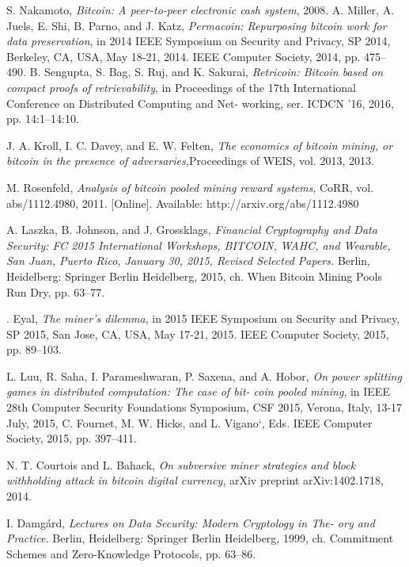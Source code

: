 \documentclass[12pt]{article}
\begin{document}
\begin{thebibliography}{9}
 
 S. Nakamoto,
 \textit{Bitcoin: A peer-to-peer electronic cash system}, 2008.
 A. Miller, A. Juels, E. Shi, B. Parno, and J. Katz,
 \textit{Permacoin: Repurposing bitcoin work for data preservation}, in 2014 IEEE Symposium on Security and Privacy, SP 2014, Berkeley, CA, USA, May 18-21, 2014. IEEE Computer Society, 2014, pp. 475–490.
 B. Sengupta, S. Bag, S. Ruj, and K. Sakurai,
 \textit{Retricoin: Bitcoin based on compact proofs of retrievability}, in Proceedings of the 17th International Conference on Distributed Computing and Net- working, ser. ICDCN ’16, 2016, pp. 14:1–14:10.

 J. A. Kroll, I. C. Davey, and E. W. Felten,
 \textit{The economics of bitcoin mining, or bitcoin in the presence of adversaries,}Proceedings of WEIS, vol. 2013, 2013.

 M. Rosenfeld,
 \textit{Analysis of bitcoin pooled mining reward systems}, CoRR, vol. abs/1112.4980, 2011. [Online]. Available: http://arxiv.org/abs/1112.4980

 A. Laszka, B. Johnson, and J. Grossklags,
 \textit{Financial Cryptography and Data Security: FC 2015 International Workshops, BITCOIN, WAHC, and Wearable, San Juan, Puerto Rico, January 30, 2015, Revised Selected Papers.} Berlin, Heidelberg: Springer Berlin Heidelberg, 2015, ch. When Bitcoin Mining Pools Run Dry, pp. 63–77.

 . Eyal,
 \textit{The miner’s dilemma}, in 2015 IEEE Symposium on Security and Privacy, SP 2015, San Jose, CA, USA, May 17-21, 2015. IEEE Computer Society, 2015, pp. 89–103.

 L. Luu, R. Saha, I. Parameshwaran, P. Saxena, and A. Hobor,
 \textit{On power splitting games in distributed computation: The case of bit- coin pooled mining}, in IEEE 28th Computer Security Foundations Symposium, CSF 2015, Verona, Italy, 13-17 July, 2015, C. Fournet, M. W. Hicks, and L. Vigano`, Eds. IEEE Computer Society, 2015, pp. 397–411.

 N. T. Courtois and L. Bahack,
 \textit{On subversive miner strategies and block withholding attack in bitcoin digital currency}, arXiv preprint arXiv:1402.1718, 2014.

 I. Damg{\'a}rd,
 \textit{Lectures on Data Security: Modern Cryptology in The- ory and Practice.} Berlin, Heidelberg: Springer Berlin Heidelberg, 1999, ch. Commitment Schemes and Zero-Knowledge Protocols, pp. 63–86.


\end{thebibliography}
\end{document}
